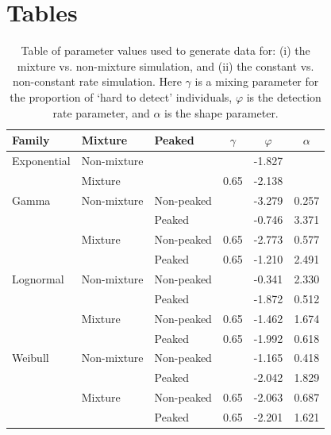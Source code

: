\documentclass[useAMS,usenatbib,referee,12pt]{article}
\begin{document}
\section{Tables}
\begin{table}[!ht]
\centering
\begin{tabular}{lll|ccc}
  \hline
Family & Mixture & Peaked & $\gamma$ & $\varphi$ & $\alpha$ \\ 
  \hline
Exponential & Non-mixture & &  & -1.827 &  \\ 
  & Mixture & & 0.65 & -2.138 &  \\ 
  \hline
  Gamma & Non-mixture & Non-peaked &  & -3.279 & 0.257 \\ 
  & & Peaked &  & -0.746 & 3.371 \\ 
  & Mixture & Non-peaked & 0.65 & -2.773 & 0.577 \\ 
  & & Peaked & 0.65 & -1.210 & 2.491 \\ 
  \hline
  Lognormal & Non-mixture & Non-peaked &  & -0.341 & 2.330 \\ 
  & & Peaked &  & -1.872 & 0.512 \\ 
  & Mixture & Non-peaked & 0.65 & -1.462 & 1.674 \\ 
  & & Peaked & 0.65 & -1.992 & 0.618 \\ 
  \hline
  Weibull & Non-mixture & Non-peaked &  & -1.165 & 0.418 \\ 
  & & Peaked &  & -2.042 & 1.829 \\ 
  & Mixture & Non-peaked & 0.65 & -2.063 & 0.687 \\ 
  & & Peaked & 0.65 & -2.201 & 1.621 \\ 
   \hline
\end{tabular}
\caption{\label{simvals}Table of parameter values used to generate data for: (i) the mixture vs. non-mixture simulation, and (ii) the constant vs. non-constant rate simulation.  Here $\gamma$ is a mixing parameter for the proportion of `hard to detect' individuals, $\varphi$ is the detection rate parameter, and $\alpha$ is the shape parameter.}
\end{table}
\end{document}
